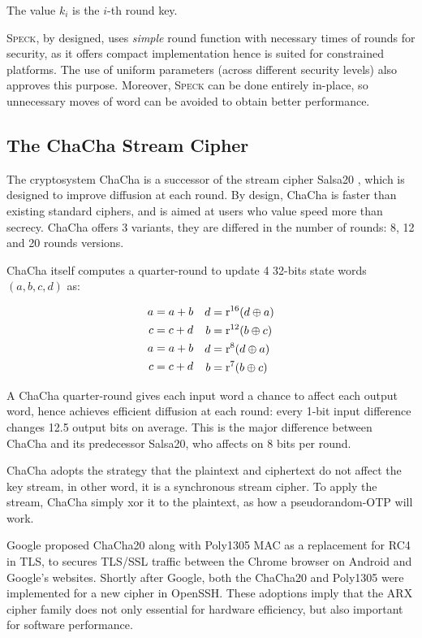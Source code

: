 \noindent The value $k_i$ is the $i$-th round key.

\textsc{Speck}, by designed, uses \textit{simple} round function with necessary times
of rounds for security, as it offers compact implementation hence is suited for
constrained platforms. The use of uniform parameters (across different security levels)
also approves this purpose. Moreover, \textsc{Speck} can be done entirely in-place, so
unnecessary moves of word can be avoided to obtain better performance.

\subsection{The ChaCha Stream Cipher}

The cryptosystem ChaCha is a successor of the stream cipher Salsa20
\cite{bernstein2008salsa20}, which is designed to improve diffusion at each round. By
design, ChaCha is faster than existing standard ciphers, and is aimed at users who
value speed more than secrecy. ChaCha offers 3 variants, they are differed in the number
of rounds: 8, 12 and 20 rounds versions.

ChaCha itself computes a quarter-round to update 4 32-bits state words $(a,b,c,d)$ as:

\begin{equation*}
\setlength{\abovedisplayshortskip}{0em}
\setlength{\abovedisplayskip}{0em}
\begin{split}
a &= a+b\\[1pt]
c &= c+d\\[1pt]
a &= a+b\\[1pt]
c &= c+d\\[1pt]
\end{split}
\quad
\begin{split}
d &= \mathrm{r}^{16}(d\oplus a)\\
b &= \mathrm{r}^{12}(b\oplus c)\\
d &= \mathrm{r}^{8}(d\oplus a)\\
b &= \mathrm{r}^{7}(b\oplus c)\\
\end{split}
\end{equation*}

A ChaCha quarter-round gives each input word a chance to affect each output word, hence
achieves efficient diffusion at each round: every 1-bit input difference changes 12.5
output bits on average. This is the major difference between ChaCha and its predecessor
Salsa20, who affects on 8 bits per round.

ChaCha adopts the strategy that the plaintext and ciphertext do not affect the key stream,
in other word, it is a synchronous stream cipher. To apply the stream, ChaCha simply xor
it to the plaintext, as how a pseudorandom-OTP will work.

Google proposed ChaCha20 along with Poly1305 MAC as a replacement for RC4 in TLS, to
secures TLS/SSL traffic between the Chrome browser on Android and Google's websites.
Shortly after Google, both the ChaCha20 and Poly1305 were implemented for a new
cipher in OpenSSH. These adoptions imply that the ARX cipher family does not only
essential for hardware efficiency, but also important for software performance.
